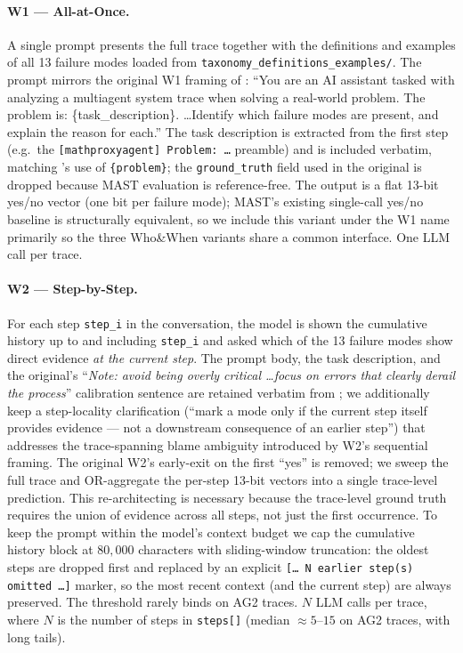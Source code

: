 \paragraph{W1 --- All-at-Once.}
A single prompt presents the full trace together with the
definitions and examples of all 13 failure modes loaded from
\texttt{taxonomy\_definitions\_examples/}. The prompt mirrors the
original \textsc{W1} framing of \citet{yin2025whoandwhen}: ``You
are an AI assistant tasked with analyzing a multiagent system trace
when solving a real-world problem. The problem is:
\{task\_description\}. \ldots Identify which failure modes are
present, and explain the reason for each.'' The task description
is extracted from the first step (e.g.\ the \texttt{[mathproxyagent]
Problem: \ldots} preamble) and is included verbatim, matching
\citet{yin2025whoandwhen}'s use of \texttt{\{problem\}}; the
\texttt{ground\_truth} field used in the original is dropped
because MAST evaluation is reference-free. The output is a flat
13-bit yes/no vector (one bit per failure mode); MAST's existing
single-call yes/no baseline is structurally equivalent, so we
include this variant under the \textsc{W1} name primarily so the
three Who\&When variants share a common interface. One LLM call
per trace.

\paragraph{W2 --- Step-by-Step.}
For each step \texttt{step\_i} in the conversation, the model is
shown the cumulative history up to and including \texttt{step\_i}
and asked which of the 13 failure modes show direct evidence
\emph{at the current step}. The prompt body, the task description,
and the original's
``\emph{Note: avoid being overly critical \ldots focus on errors
that clearly derail the process}'' calibration sentence are
retained verbatim from \citet{yin2025whoandwhen}; we additionally
keep a step-locality clarification (``mark a mode only if the
current step itself provides evidence --- not a downstream
consequence of an earlier step'') that addresses the
trace-spanning blame ambiguity introduced by \textsc{W2}'s
sequential framing. The original \textsc{W2}'s early-exit on the
first ``yes'' is removed; we sweep the full trace and
OR-aggregate the per-step 13-bit vectors into a single
trace-level prediction. This re-architecting is necessary because
the trace-level ground truth requires the union of evidence
across all steps, not just the first occurrence. To keep the
prompt within the model's context budget we cap the cumulative
history block at $80{,}000$ characters with sliding-window
truncation: the oldest steps are dropped first and replaced by an
explicit \texttt{[\ldots\ N earlier step(s) omitted \ldots]}
marker, so the most recent context (and the current step) are
always preserved. The threshold rarely binds on AG2 traces.
$N$ LLM calls per trace, where $N$ is the number of steps in
\texttt{steps[]} (median $\approx 5$--$15$ on AG2 traces, with
long tails).

